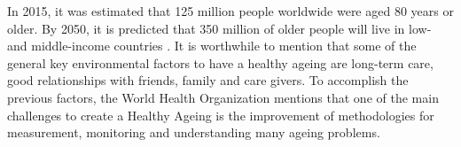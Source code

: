 \documentclass[12pt,journal,onecolumn,compsoc]{IEEEtran}
\begin{document}
\maketitle


\IEEEdisplaynontitleabstractindextext

\IEEEpeerreviewmaketitle







In 2015, it was estimated that 125 million people worldwide were aged 80 years or older.
By 2050, it is predicted that 350 million of older people will live in low- and middle-income countries \cite{AH16}. 
It is worthwhile to mention that some of the general key environmental factors to have a healthy ageing are
long-term care, good relationships with friends, family and care givers.
To accomplish the previous factors, 
the World Health Organization mentions 
that one of the main challenges to create a Healthy Ageing
is the  improvement of methodologies for measurement, monitoring and understanding  
many ageing problems.


\end{document}
